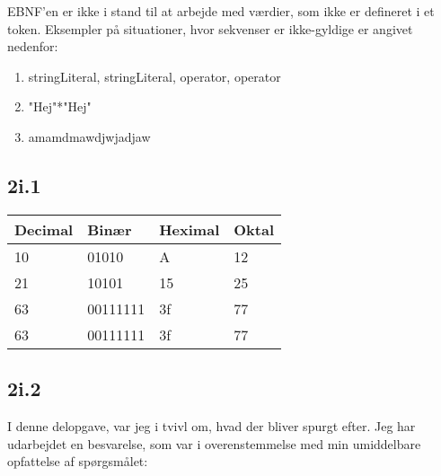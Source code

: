 EBNF'en er ikke i stand til at arbejde med værdier, som ikke er defineret i et token. Eksempler på situationer, hvor sekvenser er ikke-gyldige er angivet nedenfor:
\newline
\begin{enumerate}
\item{stringLiteral, stringLiteral, operator, operator}
\item{"Hej"*"Hej"}
\item{amamdmawdjwjadjaw}
\end{enumerate}


\subsection*{2i.1}
\begin{center}
    \begin{tabular}{ | l | l | l | l |}
    \hline
    Decimal & Binær & Heximal & Oktal \\ \hline
    10 & 01010 & A & 12 \\ \hline
    21 & 10101 & 15 & 25 \\ \hline
    63 & 00111111 & 3f & 77 \\ \hline
    63 & 00111111 & 3f & 77 \\
    \hline
    \end{tabular}
\end{center}


\subsection*{2i.2}

I denne delopgave, var jeg i tvivl om, hvad der bliver spurgt efter. Jeg har udarbejdet en besvarelse, som var i overenstemmelse med min umiddelbare opfattelse af spørgsmålet: 


